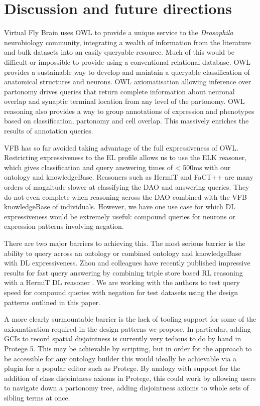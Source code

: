 \documentclass[runningheads,a4paper]{llncs}
\begin{document}
\section{Discussion and future directions}


Virtual Fly Brain uses OWL to provide a unique service to the
\textit{Drosophila} neurobiology community, integrating a wealth of
information from the literature and bulk datasets into an easily
queryable resource.  Much of this would be difficult or impossible to
provide using a conventional relational database. OWL
provides a sustainable way to develop and maintain a queryable
classification of anatomical structures and neurons.  OWL
axiomatisation allowing inference over partonomy drives queries that
 return complete information about neuronal overlap and synaptic
 terminal location from any level of the partonomy.  OWL reasoning
 also provides a way to group annotations of expression and phenotypes
 based on classification, partonomy and cell overlap.  This massively
 enriches the results of annotation queries.


VFB has so far avoided taking advantage of the full expressiveness of
OWL. Restricting expressiveness to the EL profile allows us to use the
ELK reasoner, which gives classification and query
answering times of < 500ms with our ontology and
knowledgeBase. Reasoners such as HermiT\cite{HermiT2008} and FaCT++
\cite{Fact2006}  are many orders of magnitude slower at classifying
the DAO and answering queries.  They do not even complete when
reasoning across the DAO combined with the VFB knowledgeBase of
individuals.  However, we have one use case for which DL
expressiveness would be extremely useful: compound queries for neurons
or expression patterns involving negation.

There are two major barriers to achieving this. The most serious
barrier is the ability to query across an ontology or combined ontology and
knowledgeBase with DL expressiveness.  Zhou and colleagues have
recently published impressive results for fast query answering by
combining triple store based RL reasoning with a HermiT DL reasoner
\cite{ZNCH14a}.  We are working with the authors to test query speed
for compound queries with negation for test datasets using the design
patterns outlined in this paper.

A more clearly surmountable barrier is the lack of tooling support for
some of the axiomatisation required in the design patterns we propose.  In
particular, adding GCIs to record spatial disjointness is currently
very tedious to do by hand in Protege 5.  This may be achievable by
scripting, but in order for the approach to be accessible for any
ontology builder this would ideally be achievable via a plugin for a
popular editor such as Protege.  By analogy with support for the
addition of class disjointness axioms in Protege, this could work by allowing
users to navigate down a partonomy tree, adding disjointness axioms to
whole sets of sibling terms at once.
\end{document}
